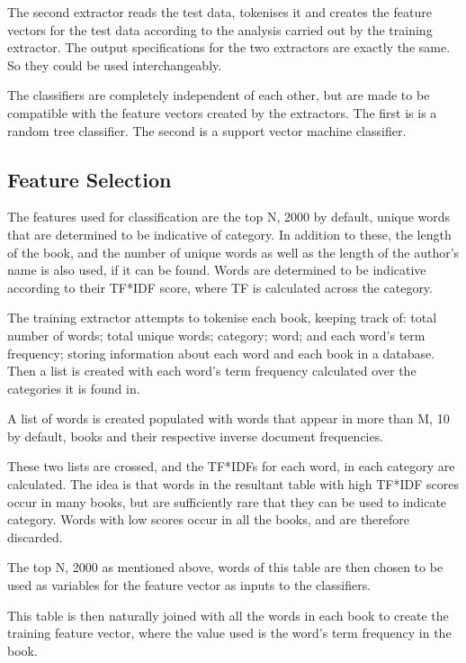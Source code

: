 \documentclass[11pt]{article}
\begin{document}
The second extractor reads the test data, tokenises it and creates the feature
vectors for the test data according to the analysis carried out by the training
extractor. The output specifications for the two extractors are exactly the
same. So they could be used interchangeably.

The classifiers are completely independent of each other, but are made to be
compatible with the feature vectors created by the extractors. The first is is a
random tree classifier. The second is a support vector machine classifier.

\subsection{Feature Selection}

The features used for classification are the top N, 2000 by default, unique
words that are determined to be indicative of category. In addition to these,
the length of the book, and the number of unique words as well as the length of
the author's name is also used, if it can be found.  Words are determined to be
indicative according to their TF*IDF score, where TF is calculated across the
category.

The training extractor attempts to tokenise each book, keeping track of: total
number of words; total unique words; category; word; and each word's term
frequency; storing information about each word and each book in a database.
Then a list is created with each word's term frequency calculated over the
categories it is found in.

A list of words is created populated with words that appear in more than M, 10
by default, books and their respective inverse document frequencies. 

These two lists are crossed, and the TF*IDFs for each word, in each category are
calculated. The idea is that words in the resultant table with high TF*IDF
scores occur in many books, but are sufficiently rare that they can be used to
indicate category. Words with low scores occur in all the books, and are
therefore discarded.

The top N, 2000 as mentioned above, words of this table are then chosen
to be used as variables for the feature vector as inputs to the classifiers.

This table is then naturally joined with all the words in each book to create
the training feature vector, where the value used is the word's term frequency
in the book. 
\end{document}
